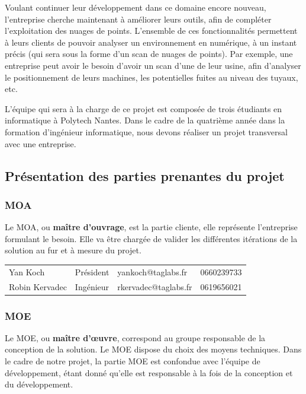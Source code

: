 \documentclass[12pt,titlepage,french]{article}
\begin{document}
Voulant continuer leur développement dans ce domaine encore nouveau, l'entreprise cherche maintenant à améliorer leurs outils, afin de compléter l'exploitation des nuages de points. L'ensemble de ces fonctionnalités permettent à leurs clients de pouvoir analyser un environnement en numérique, à un instant précis (qui sera sous la forme d'un scan de nuages de points). Par exemple, une entreprise peut avoir le besoin d'avoir un scan d'une de leur usine, afin d'analyser le positionnement de leurs machines, les potentielles fuites au niveau des tuyaux, etc.

L'équipe qui sera à la charge de ce projet est composée de trois étudiants en informatique à Polytech Nantes. Dans le cadre de la quatrième année dans la formation d'ingénieur informatique, nous devons réaliser un projet transversal avec une entreprise.

\subsection*{Présentation des parties prenantes du projet}

\subsubsection*{MOA}

Le MOA, ou \textbf{maître d'ouvrage}, est la partie cliente, elle représente l'entreprise formulant le besoin.
Elle va être chargée de valider les différentes itérations de la solution au fur et à mesure du projet.\\


\noindent\begin{tabu} to \textwidth {X[c]X[c]X[c]X[c]}\toprule
   &&        &\\\toprule
      Yan Koch&   Président&  yankoch@taglabs.fr&    0660239733\\\midrule
Robin Kervadec&   Ingénieur&rkervadec@taglabs.fr&    0619656021\\\bottomrule
\end{tabu}


\subsubsection*{MOE}


Le MOE, ou \textbf{maître d'œuvre}, correspond au groupe responsable de la conception de la solution.
Le MOE dispose du choix des moyens techniques.
Dans le cadre de notre projet, la partie MOE est confondue avec l'équipe de développement, étant donné qu'elle est responsable à la fois de la conception et du développement.\\
\end{document}
